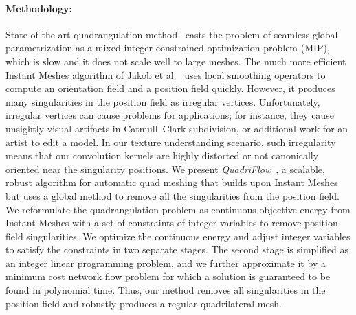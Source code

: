 \paragraph*{Methodology:} State-of-the-art quadrangulation method~\cite{bommes2009mixed} casts the problem of seamless global parametrization as a mixed-integer constrained optimization problem (MIP), which is slow and it does not scale well to large meshes. The much more efficient Instant Meshes algorithm of Jakob et al.~\cite{jakob2015instant} uses local smoothing operators to compute an orientation field and a position field quickly. However, it produces many singularities in the position field as irregular vertices. Unfortunately, irregular vertices can cause problems for applications; for instance, they cause unsightly visual artifacts in Catmull--Clark subdivision, or additional work for an artist to edit a model. In our texture understanding scenario, such irregularity means that our convolution kernels are highly distorted or not canonically oriented near the singularity positions.
%
We present \emph{QuadriFlow}~\cite{huang2018quadriflow}, a scalable, robust algorithm for automatic quad meshing that builds upon Instant Meshes but uses a global method to remove all the singularities from the position field.
We reformulate the quadrangulation problem as continuous objective energy from Instant Meshes with a set of constraints of integer variables to remove position-field singularities. We optimize the continuous energy and adjust integer variables to satisfy the constraints in two separate stages. The second stage is simplified as an integer linear programming problem, and we further approximate it by a minimum cost network flow problem for which a solution is guaranteed to be found in polynomial time. Thus, our method removes all singularities in the position field and robustly produces a regular quadrilateral mesh.

